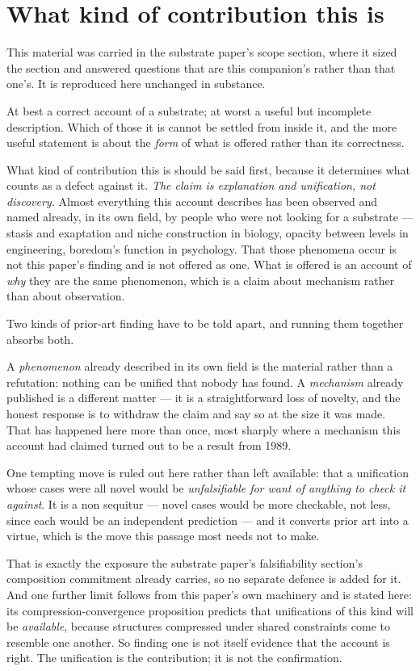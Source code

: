 \documentclass[11pt,a4paper]{article}
\theoremstyle{remark}\newtheorem{remark}[definition]{Remark}
\begin{document}
\section{What kind of contribution this is}\label{sec:contribution}
This material was carried in the substrate paper's scope section, where it sized the section and
answered questions that are this companion's rather than that one's. It is reproduced here
unchanged in substance.

At best a correct account of a substrate; at worst a useful but incomplete description. Which of
those it is cannot be settled from inside it, and the more useful statement is about the \emph{form}
of what is offered rather than its correctness.

What kind of contribution this is should be said first, because it determines what counts as a defect
against it. \emph{The claim is explanation and unification, not discovery.} Almost everything this
account describes has been observed and named already, in its own field, by people who were not
looking for a substrate --- stasis and exaptation and niche construction in biology, opacity between
levels in engineering, boredom's function in psychology. That those phenomena occur is not this
paper's finding and is not offered as one. What is offered is an account of \emph{why} they are the
same phenomenon, which is a claim about mechanism rather than about observation.

Two kinds of prior-art finding have to be told apart, and running them together absorbs both.

A \emph{phenomenon} already described in its own field is the material rather than a refutation:
nothing can be unified that nobody has found. A \emph{mechanism} already published is a different
matter --- it is a straightforward loss of novelty, and the honest response is to withdraw the claim
and say so at the size it was made. That has happened here more than once, most sharply where a
mechanism this account had claimed turned out to be a result from 1989.

One tempting move is ruled out here rather than left available: that a unification whose cases were
all novel would be \emph{unfalsifiable for want of anything to check it against}. It is a non
sequitur --- novel cases would be more checkable, not less, since each would be an independent
prediction --- and it converts prior art into a virtue, which is the move this passage most needs not
to make.

That is exactly the exposure the substrate paper's falsifiability section's composition commitment already
carries, so no separate defence is added for it. And one further limit follows from this paper's own
machinery and is stated here:
its compression-convergence proposition predicts that unifications of this kind will be
\emph{available}, because structures compressed under shared constraints come to resemble one another.
So finding one is not itself evidence that the account is right. The unification is the contribution;
it is not the confirmation.
\end{document}
